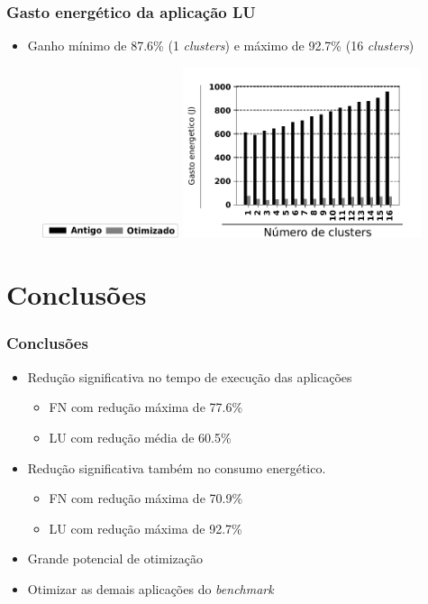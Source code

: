 \documentclass[xcolor={table}]{beamer}
\begin{document}
\begin{frame}\frametitle{Gasto energético da aplicação LU}
\begin{itemize}
\item Ganho mínimo de 87.6\% (1 \textit{clusters}) e máximo de 92.7\% (16 \textit{clusters})
\end{itemize}
\begin{figure}
    \centering
    \includegraphics[width=4cm, keepaspectratio]{figs/legend.pdf}
    \label{fig:fig8}
    \includegraphics[width=7cm, keepaspectratio]{figs/lupower.pdf}
    \label{fig:fig8}
\end{figure}
\end{frame}

\section{Conclusões}
\begin{frame}\frametitle{Conclusões}
    \begin{itemize}
        \item Redução significativa no tempo de execução das aplicações
	    \begin{itemize}
        	\item FN com redução máxima de 77.6\%
    		\item LU com redução média de 60.5\%
    	\end{itemize}
        \item Redução significativa também no consumo energético.
	    \begin{itemize}
        	\item FN com redução máxima de 70.9\%
    		\item LU com redução máxima de 92.7\%
    	\end{itemize}
    	\item Grande potencial de otimização
    	\item Otimizar as demais aplicações do \textit{benchmark}
    \end{itemize}

\end{frame}
\end{document}

